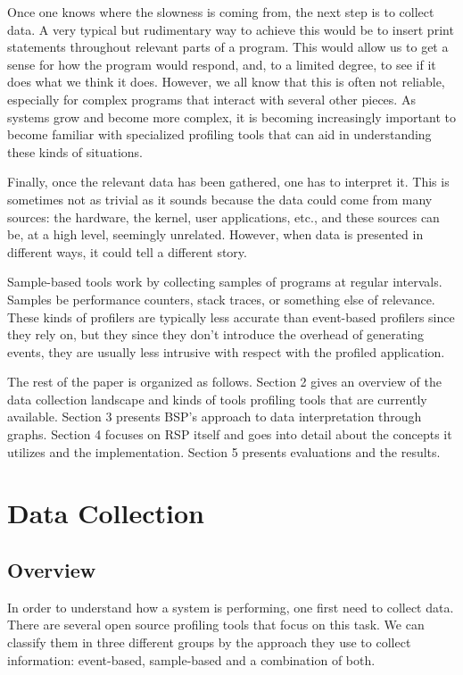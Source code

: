 \documentclass[10pt]{article}
\begin{document}
Once one knows where the slowness is coming from, the next step is to collect data. A very typical but rudimentary way to achieve this would be to insert print statements throughout relevant parts of a program. This would allow us to get a sense for how the program would respond, and, to a limited degree, to see if it does what we think it does. However, we all know that this is often not reliable, especially for complex programs that interact with several other pieces. As systems grow and become more complex, it is becoming increasingly important to become familiar with specialized profiling tools that can aid in understanding these kinds of situations.

Finally, once the relevant data has been gathered, one has to interpret it. This is sometimes not as trivial as it sounds because the data could come from many sources: the hardware, the kernel, user applications, etc., and these sources can be, at a high level, seemingly unrelated. However, when data is  presented in different ways, it could tell a different story.

Sample-based tools work by collecting samples of programs at regular intervals.  Samples be performance counters, stack traces, or something else of relevance. These kinds of profilers are typically less accurate than event-based profilers since they rely on, but they since they don't introduce the overhead of generating events, they are usually less intrusive with respect with the profiled application.

The rest of the paper is organized as follows. Section 2 gives an overview of the data collection landscape and kinds of tools profiling tools that are currently available. Section 3 presents BSP's approach to data interpretation through graphs. Section 4 focuses on RSP itself and goes into detail about the concepts it utilizes and the implementation. Section 5 presents evaluations and the results.

\section{Data Collection}
\subsection{Overview}
In order to understand how a system is performing, one first need to collect data. There are several open source profiling tools that focus on this task. We can classify them in three different groups by the approach they use to collect information: event-based, sample-based and a combination of both. 
\end{document}
